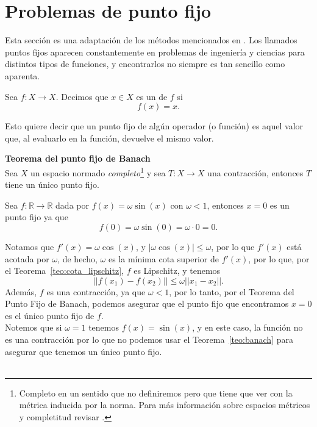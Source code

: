 \documentclass[12pt]{book}
\begin{document}
\section{Problemas de punto fijo}
\noindent
Esta sección es una adaptación de los métodos mencionados en \cite{quarteroni2006numerical}. Los llamados puntos fijos aparecen constantemente en problemas de ingeniería y ciencias para distintos tipos de funciones, y encontrarlos no siempre es tan sencillo como aparenta.

\begin{definitionenv}
    Sea $f:X\to X$. Decimos que $x\in X$ es un  de $f$ si
    \[
        f(x) = x.
    \]
\end{definitionenv}

Esto quiere decir que un punto fijo de algún operador (o función) es aquel valor que, al evaluarlo en la función, devuelve el mismo valor.

\begin{theoremenv}\label{teo:banach}
    \textbf{Teorema del punto fijo de Banach}\\
    Sea $X$ un espacio normado \textit{completo}\footnote{Completo en un sentido que no definiremos pero que tiene que ver con la métrica inducida por la norma. Para más información sobre espacios métricos y completitud revisar \cite[Chapter 1, Section 1.4]{kreyszig1991introductory}.} y sea  $T:X\to X$ una contracción, entonces $T$ tiene un único punto fijo.
\end{theoremenv}

\begin{exampleenv}
Sea $f:\mathbb{R}\to\mathbb{R}$ dada por $f(x)=\omega\sin(x)$ con $\omega<1$, entonces $x =0$ es un punto fijo ya que
\[
    f(0)=\omega\sin(0)=\omega\cdot0=0.
\]

Notamos que $f'(x)=\omega\cos(x)$, y $|\omega\cos(x)|\leq\omega$, por lo que $f'(x)$ está acotada por $\omega$, de hecho, $\omega$ es la mínima cota superior de $f'(x)$, por lo que, por el Teorema~\ref{teo:cota_lipschitz}, $f$ es Lipschitz, y tenemos
\[
||f(x_1)-f(x_2)||\leq \omega||x_1-x_2||.
\]
Además, $f$ es una contracción, ya que $\omega <1$, por lo tanto, por el Teorema del Punto Fijo de Banach, podemos asegurar que el punto fijo que encontramos $x=0$ es el único punto fijo de $f$.\\

Notemos que si $\omega=1$ tenemos $f(x)=\sin(x)$, y en este caso, la función no es una contracción por lo que no podemos usar el Teorema~\ref{teo:banach} para asegurar que tenemos un único punto fijo.\\\\
\end{exampleenv}
\end{document}
